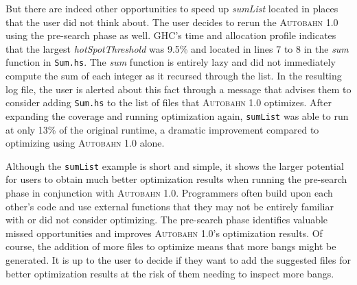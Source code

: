 \documentclass[format=sigplan, review=true]{acmart}
\newcommand{\hotspots}[0]{hot spots}
\newcommand{\hotspotcost}[0]{\textit{hotSpotThreshold}}
\newcommand{\Ao}[0]{\textsc{Autobahn 1.0}}
\newcommand{\preopt}[0]{pre-search}
\begin{document}
But there are indeed other opportunities to speed up \textit{sumList} located in places that the user did not think about. The user decides to rerun the \Ao{} using the \preopt{} phase as well. GHC's time and allocation profile indicates that the largest \hotspotcost{} was 9.5\% and located in lines 7 to 8 in the \textit{sum} function in \texttt{Sum.hs}. The \textit{sum} function is entirely lazy and did not immediately compute the sum of each integer as it recursed through the list. In the resulting log file, the user is alerted about this fact through a message that advises them to consider adding \texttt{Sum.hs} to the list of files that \Ao{} optimizes. After expanding the coverage and running optimization again, \texttt{sumList} was able to run at only 13\% of the original runtime, a dramatic improvement compared to optimizing using \Ao{} alone.

Although the \texttt{sumList} example is short and simple, it shows the larger potential for users to obtain much better optimization results when running the \preopt{} phase in conjunction with \Ao{}. Programmers often build upon each other's code and use external functions that they may not be entirely familiar with or did not consider optimizing. The \preopt{} phase identifies valuable missed opportunities and improves \Ao{}'s optimization results. Of course, the addition of more files to optimize means that more bangs might be generated. It is up to the user to decide if they want to add the suggested files for better optimization results at the risk of them needing to inspect more bangs.
\newline

\end{document}
